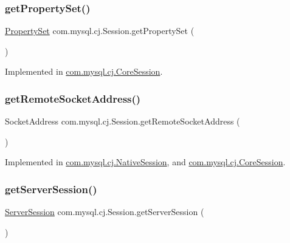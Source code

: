 \subsubsection{\texorpdfstring{get\+Property\+Set()}{getPropertySet()}}
{\footnotesize\ttfamily \mbox{\hyperlink{interfacecom_1_1mysql_1_1cj_1_1conf_1_1_property_set}{Property\+Set}} com.\+mysql.\+cj.\+Session.\+get\+Property\+Set (\begin{DoxyParamCaption}{ }\end{DoxyParamCaption})}



Implemented in \mbox{\hyperlink{classcom_1_1mysql_1_1cj_1_1_core_session_a1b6c6041a2c657d34bb369939f6b49d2}{com.\+mysql.\+cj.\+Core\+Session}}.

\mbox{\label{interfacecom_1_1mysql_1_1cj_1_1_session_aa003329ef0d9384f7fccc8386d125c6d}} 
\subsubsection{\texorpdfstring{get\+Remote\+Socket\+Address()}{getRemoteSocketAddress()}}
{\footnotesize\ttfamily Socket\+Address com.\+mysql.\+cj.\+Session.\+get\+Remote\+Socket\+Address (\begin{DoxyParamCaption}{ }\end{DoxyParamCaption})}



Implemented in \mbox{\hyperlink{classcom_1_1mysql_1_1cj_1_1_native_session_a1b2b6019a770001c7d76252b458ac694}{com.\+mysql.\+cj.\+Native\+Session}}, and \mbox{\hyperlink{classcom_1_1mysql_1_1cj_1_1_core_session_aeab5194dc712d997482f989571df4ab2}{com.\+mysql.\+cj.\+Core\+Session}}.

\mbox{\label{interfacecom_1_1mysql_1_1cj_1_1_session_afbb4c17c563ed89e60172341fbea39ca}} 
\subsubsection{\texorpdfstring{get\+Server\+Session()}{getServerSession()}}
{\footnotesize\ttfamily \mbox{\hyperlink{interfacecom_1_1mysql_1_1cj_1_1protocol_1_1_server_session}{Server\+Session}} com.\+mysql.\+cj.\+Session.\+get\+Server\+Session (\begin{DoxyParamCaption}{ }\end{DoxyParamCaption})}



